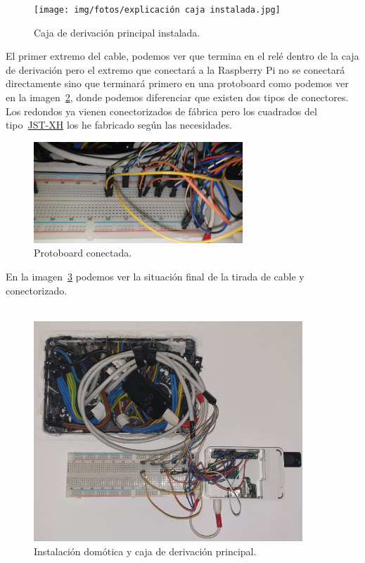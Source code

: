\begin{figure}[h]
    \centering
    \texttt{[image: img/fotos/explicación caja instalada.jpg]}
    \caption{Caja de derivación principal instalada.} \label{Img:CajaDerivacionPrincipal}
\end{figure}

El primer extremo del cable, podemos ver que termina en el relé dentro de la caja de derivación pero el extremo que conectará a la Raspberry Pi no se conectará directamente sino que terminará primero en una protoboard como podemos ver en la imagen~\ref{Img:ProtoboardConecada}, donde podemos diferenciar que existen dos tipos de conectores. Los redondos ya vienen conectorizados de fábrica pero los cuadrados del tipo~\href{https://ae01.alicdn.com/kf/H4205e9c4ec4c4be4864e44b6925a22bdf/10-juegos-de-conector-de-Cable-de-2-54mm-XH2-54-conector-XH-macho-y-hembra.jpg_Q90.jpg_.webp}{JST-XH} los he fabricado según las necesidades.

\begin{figure}[h]
    \centering
    \includegraphics[width=0.7\textwidth]{img/fotos/protoboard-instalada.jpeg}
    \caption{Protoboard conectada.} \label{Img:ProtoboardConecada}
\end{figure}

En la imagen~\ref{Img:InstalacionDomotica} podemos ver la situación final de la tirada de cable y conectorizado.~\\~\\

\begin{figure}[h]
    \centering
    \includegraphics[width=0.9\textwidth]{img/fotos/RBP-instalada.jpeg}
    \caption{Instalación domótica y caja de derivación principal.} \label{Img:InstalacionDomotica}
\end{figure}


